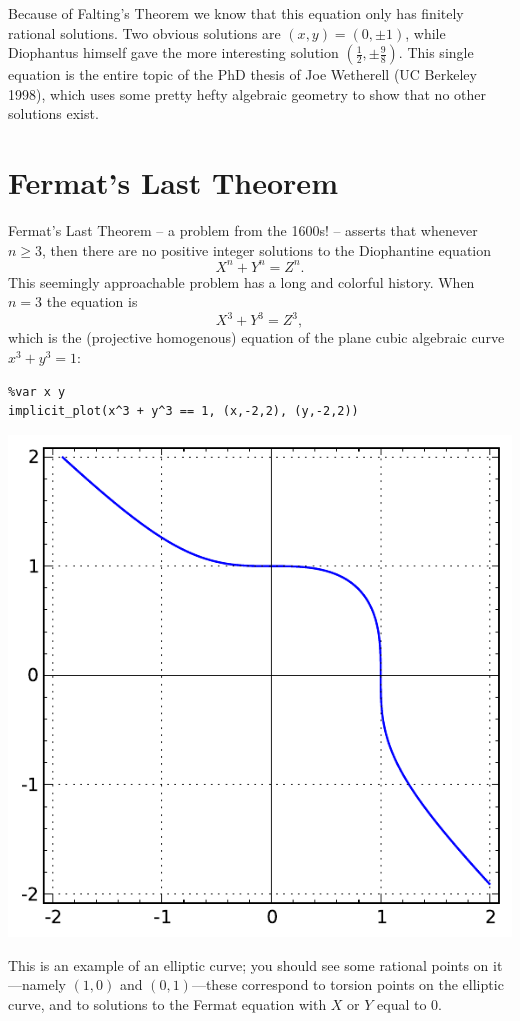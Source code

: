 \documentclass{book}
\theoremstyle{plain}
\theoremstyle{definition}
\numberwithin{equation}{section}
\numberwithin{figure}{section}
\numberwithin{table}{section}
\begin{document}
Because of Falting's Theorem we know that this equation only has finitely rational solutions. Two obvious solutions are $(x,y) = (0,\pm 1)$, while Diophantus himself gave the more interesting solution $(\frac{1}{2},\pm \frac{9}{8})$. This single equation is the entire topic of the PhD thesis of Joe Wetherell (UC Berkeley 1998), which uses some pretty hefty algebraic geometry to show that no other solutions exist. \\


\section{Fermat's Last Theorem}\label{sec:fltintro}
Fermat's Last Theorem -- a problem from the 1600s! -- asserts
that whenever $n\geq 3$, then there are no positive integer
solutions to the Diophantine equation
$$
X^n + Y^n = Z^n.
$$
This seemingly approachable problem has a long and colorful
history.
When $n=3$ the equation is
$$
X^3 + Y^3 = Z^3,
$$
which is the (projective homogenous) equation of the plane cubic algebraic
curve $x^3 + y^3 = 1$:
\begin{lstlisting}
%var x y
implicit_plot(x^3 + y^3 == 1, (x,-2,2), (y,-2,2))
\end{lstlisting}
\begin{center}
\includegraphics[width=.5\textwidth]{pics/flt3.pdf}
\end{center}
This is an example of an elliptic curve; you should
see some rational points on it---namely $(1,0)$ and $(0,1)$---these
correspond to torsion points on the elliptic curve, and to solutions
to the Fermat equation with $X$ or $Y$ equal to $0$.
\end{document}
